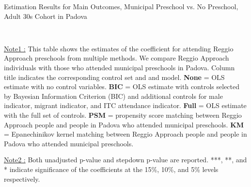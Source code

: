 \begin{table}[H] \caption{Estimation Results for Main Outcomes, Municipal Preschool vs. No Preschool, Adult 30s Cohort in Padova} \label{ols-M-adult30-reg-muni-padova}
\scalebox{0.62}{}
\vspace{1ex} \\
\footnotesize\raggedright{\underline{Note1 :} This table shows the estimates of the coefficient for attending Reggio Approach preschools from multiple methods. We compare Reggio Approach individuals with those who attended municipal preschools in Padova. Column title indicates the corresponding control set and and model. \textbf{None} = OLS estimate with no control variables. \textbf{BIC} = OLS estimate with controls selected by Bayesian Information Criterion (BIC) and additional controls for male indicator, migrant indicator, and ITC attendance indicator. \textbf{Full} = OLS estimate with the full set of controls. \textbf{PSM} =  propensity score matching between Reggio Approach people and people in Padova who attended municipal preschools. \textbf{KM} = Epanechinikov kernel matching between Reggio Approach people and people in Padova who attended municipal preschools.}

\footnotesize\raggedright{\underline{Note2 :} Both unadjusted p-value and stepdown p-value are reported. ***, **, and * indicate significance of the coefficients at the 15\%, 10\%, and 5\% levels respectively.}
\end{table}






